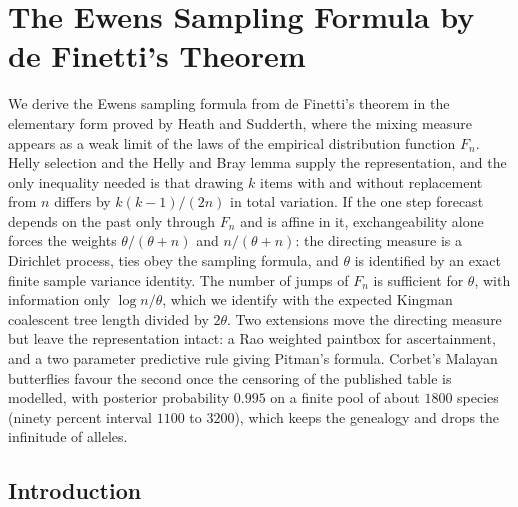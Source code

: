 \DeclareRobustCommand{\R}{\mathbb{R}}
\DeclareRobustCommand{\N}{\mathbb{N}}
\DeclareRobustCommand{\E}{\mathbb{E}}
\DeclareRobustCommand{\PP}{\mathbb{P}}
\DeclareRobustCommand{\Var}{\operatorname{Var}}
\DeclareRobustCommand{\Cov}{\operatorname{Cov}}
\DeclareRobustCommand{\Dir}{\operatorname{Dir}}
\DeclareRobustCommand{\Ptil}{\widetilde{P}}
\DeclareRobustCommand{\Ftil}{\widetilde{F}}
\DeclareRobustCommand{\Fcal}{\mathcal{F}}
\DeclareRobustCommand{\ind}[1]{\mathbf{1}\{#1\}}
\DeclareRobustCommand{\dtv}{d_{\mathrm{TV}}}
\chapter{The Ewens Sampling Formula by de Finetti's Theorem}\label{ch:esf}
\begin{chaptersummary}
We derive the Ewens sampling formula from de Finetti's theorem in the elementary form
proved by Heath and Sudderth, where the mixing measure appears as a weak limit of the
laws of the empirical distribution function $F_n$. Helly selection and the Helly and
Bray lemma supply the representation, and the only inequality needed is that drawing
$k$ items with and without replacement from $n$ differs by $k(k-1)/(2n)$ in total
variation. If the one step forecast depends on the past only through $F_n$ and is
affine in it, exchangeability alone forces the weights $\theta/(\theta+n)$ and
$n/(\theta+n)$: the directing measure is a Dirichlet process, ties obey the sampling
formula, and $\theta$ is identified by an exact finite sample variance identity. The
number of jumps of $F_n$ is sufficient for $\theta$, with information only
$\log n / \theta$, which we identify with the expected Kingman coalescent tree length
divided by $2\theta$. Two extensions move the directing measure but leave the
representation intact: a Rao weighted paintbox for ascertainment, and a two parameter
predictive rule giving Pitman's formula. Corbet's Malayan butterflies favour the
second once the censoring of the published table is modelled, with posterior probability $0.995$ on a finite pool of about $1800$ species (ninety percent interval $1100$ to $3200$), which
keeps the genealogy and drops the infinitude of alleles.
\end{chaptersummary}
\section{Introduction}

